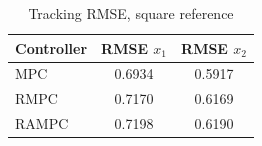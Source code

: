 \begin{table}[t]
\centering
\caption{Tracking RMSE, square reference}
\label{tab:rmse_square_mpc_rmpc_rampc}
\begin{tabular}{lcc}
\toprule
Controller & RMSE $x_1$ & RMSE $x_2$ \\
\midrule
MPC & 0.6934 & 0.5917 \\
RMPC & 0.7170 & 0.6169 \\
RAMPC & 0.7198 & 0.6190 \\
\bottomrule
\end{tabular}
\end{table}
